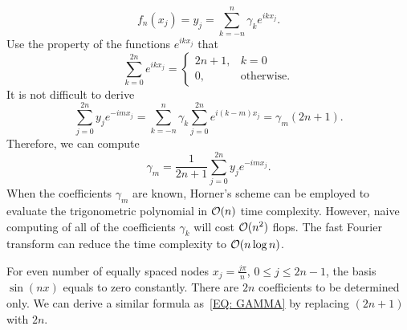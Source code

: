 \begin{equation}
    f_n(x_j) = y_j = \sum_{k=-n}^n \gamma_k e^{i k x_j}.
\end{equation}
Use the property of the functions $e^{ikx_j}$ that 
\begin{equation}
    \sum_{k=0}^{2n} e^{ik x_j} = \begin{cases}
        2n+1, & k = 0\\
        0, &\text{otherwise}.
    \end{cases}
\end{equation}
It is not difficult to derive 
\begin{equation}
    \sum_{j = 0}^{2n} y_j e^{-im x_j} = \sum_{k=-n}^{n} \gamma_k \sum_{j=0}^{2n} e^{i (k - m) x_j} = \gamma_{m} (2n+1).  
\end{equation}
Therefore, we can compute 
\begin{equation}\label{EQ: GAMMA}
    \gamma_m = \frac{1}{2n+1}  \sum_{j = 0}^{2n} y_j e^{-im x_j}.
\end{equation}
When the coefficients $\gamma_m$ are known, Horner's scheme can be employed to evaluate the trigonometric polynomial in $\mathcal O(n)$ time complexity.  However, naive computing of all of the coefficients $\gamma_k$ will cost $\mathcal O(n^2)$ flops. The fast Fourier transform can reduce the time complexity to $\mathcal O(n\log n)$.
\begin{remark}
    For even number of equally spaced nodes $x_j = \frac{j\pi}{n}$, $0\le j\le 2n-1$, the basis $\sin( n x)$ equals to zero constantly. There are $2n$ coefficients to be determined only. We can derive a similar formula as~\eqref{EQ: GAMMA} by replacing $(2n+1)$ with $2n$.
\end{remark}

